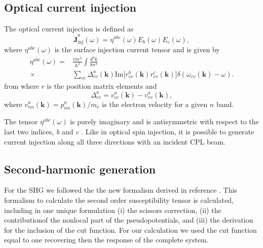 \documentclass[pss]{wiley2sp} %
\begin{document}
\subsection{Optical current injection}\label{sec:theory-OCI}

The optical current injection is defined as
\begin{equation}
\mathbf{\dot{J}}^{a}_{\text{inj}}(\omega) =
\eta^{abc}(\omega)E_{b}(\omega)E_{c}(\omega), \label{eq:eta}
\end{equation}
where $\eta^{abc}(\omega)$ is the surface injection current tensor and is given by
\begin{align*}
\eta^{abc}(\omega) =& \frac{i\pi e^{3}}{\hbar^{2}}\int\frac{d^{3}k}{8\pi^{3}}
\nonumber \\
\times &
\sum_{vc}\Delta^{a}_{cv}(\mathbf{k})\text{Im}\big[r^{b}_{cv}(\mathbf{k})
r^{c}_{cv}(\mathbf{k})\big]\delta(\omega_{cv}(\mathbf{k})-\omega).
\end{align*}
from where $r$ is the position matrix elements and 
\begin{equation*}
\Delta^{a}_{cv} = v^{a}_{cc}(\mathbf{k})-v^{a}_{vv}(\mathbf{k}),
\end{equation*}
where $v^{a}_{nn}(\mathbf{k})=p^{a}_{nn}(\mathbf{k})/m_{e}$ is the electron velocity for a given $n$ band.

The tensor $\eta^{abc}(\omega)$ is purely imaginary and is antisymmetric with respect to the last two indices, \emph{b} and \emph{c} \cite{sipePRB00,nastosPRB06}. Like in optical spin injection, it is possible to generate current injection along all three directions with an incident CPL beam.


\subsection{Second-harmonic generation}\label{sec:theory-SHG}

For the SHG we followed the the new formalism derived in reference \cite{andersonPRB15}. This formalism to calculate the second order susceptibility tensor is calculated, including in one unique formulation (i) the scissors correction, (ii) the contributionof the nonlocal part of the pseudopotentials, and (iii) the derivation for the inclusion of the cut function. For our calculation we used the cut function equal to one recovering then the response of the complete system.
\end{document}
